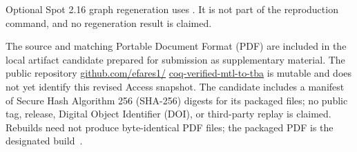\documentclass{ieeeaccess}
\begin{document}
Optional Spot 2.16 graph regeneration uses
. It is not part of the reproduction
command, and no regeneration result is claimed.

The source and matching Portable Document Format (PDF) are included in the
local artifact candidate prepared for submission as supplementary material.
The public repository \url{github.com/efares1/}\allowbreak%
\url{coq-verified-mtl-to-tba} is mutable and does not yet identify this
revised Access snapshot. The candidate
 includes a manifest of Secure Hash
Algorithm 256 (SHA-256) digests for its packaged files; no public tag, release,
Digital Object Identifier (DOI), or third-party replay is claimed. Rebuilds
need not produce byte-identical PDF files; the packaged PDF is the designated
build~\cite{openai_codex}.
\end{document}
